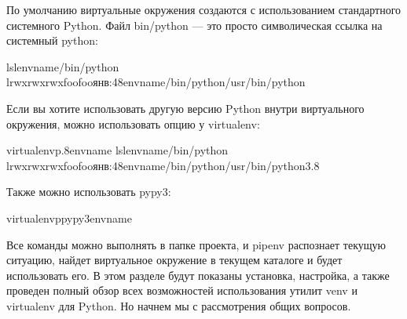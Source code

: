 \documentclass[letterpaper,10pt,russian]{sphinxmanual}
\begin{document}
\sphinxAtStartPar
{}

\sphinxAtStartPar
По умолчанию виртуальные окружения создаются с использованием стандартного системного Python. Файл bin/python — это просто символическая ссылка на системный python:

\begin{sphinxVerbatim}[commandchars=\\\{\}]
\PYGZdl{}ls\PYGZhy{}lenvname/bin/python
lrwxrwxrwxfoofooянв:48envname/bin/python\PYGZhy{}\PYGZgt{}/usr/bin/python
\end{sphinxVerbatim}

\sphinxAtStartPar
Если вы хотите использовать другую версию Python внутри виртуального окружения, можно использовать опцию  у virtualenv:

\begin{sphinxVerbatim}[commandchars=\\\{\}]
\PYGZdl{}virtualenv\PYGZhy{}p.8envname
\PYGZdl{}ls\PYGZhy{}lenvname/bin/python
lrwxrwxrwxfoofooянв:48envname/bin/python\PYGZhy{}\PYGZgt{}/usr/bin/python3.8
\end{sphinxVerbatim}

\sphinxAtStartPar
Также можно использовать pypy3:

\begin{sphinxVerbatim}[commandchars=\\\{\}]
\PYGZdl{}virtualenv\PYGZhy{}ppypy3envname
\end{sphinxVerbatim}

\sphinxAtStartPar
{}

\sphinxAtStartPar
Все команды можно выполнять в папке проекта, и pipenv распознает текущую ситуацию, найдет виртуальное окружение в текущем каталоге и будет использовать его.
В этом разделе будут показаны установка, настройка, а также проведен полный обзор всех возможностей использования утилит venv и virtualenv для Python. Но начнем мы с рассмотрения общих вопросов.
\end{document}
